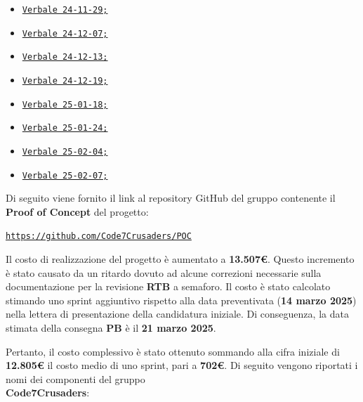 \documentclass{article}
\begin{document}
\begin{itemize}
\begin{itemize}
            \item \href{https://code7crusaders.github.io/docs/RTB/verbali_interni/verbale_24-11-29_v1.0.html}{\texttt{Verbale 24-11-29;}}
            \item \href{https://code7crusaders.github.io/docs/RTB/verbali_interni/verbale_24-12-07_v1.0.html}{\texttt{Verbale 24-12-07;}}
            \item \href{https://code7crusaders.github.io/docs/RTB/verbali_interni/verbale_24-12-13_v1.0.html}{\texttt{Verbale 24-12-13;}}
            \item \href{https://code7crusaders.github.io/docs/RTB/verbali_interni/verbale_24-12-19_v1.0.html}{\texttt{Verbale 24-12-19;}}
            \item \href{https://code7crusaders.github.io/docs/RTB/verbali_interni/verbale_25-01-18_v1.0.html}{\texttt{Verbale 25-01-18;}}
            \item \href{https://code7crusaders.github.io/docs/RTB/verbali_interni/verbale_25-01-24_v1.0.html}{\texttt{Verbale 25-01-24;}}
            \item \href{https://code7crusaders.github.io/docs/RTB/verbali_interni/verbale_25-02-04_v1.0.html}{\texttt{Verbale 25-02-04;}}
            \item \href{https://code7crusaders.github.io/docs/RTB/verbali_interni/verbale_25-02-07_v1.0.html}{\texttt{Verbale 25-02-07;}}
        \end{itemize}
\end{itemize}

Di seguito viene fornito il link al repository GitHub del gruppo contenente il \textbf{Proof of Concept} del progetto:
\begin{center}
    \texttt{\url{https://github.com/Code7Crusaders/POC}}
\end{center}

Il costo di realizzazione del progetto è aumentato a \textbf{13.507\euro}. Questo incremento è stato causato da un ritardo dovuto ad alcune correzioni necessarie sulla documentazione per la revisione \textbf{RTB} a semaforo. Il costo è stato calcolato stimando uno sprint aggiuntivo rispetto alla data preventivata (\textbf{14 marzo 2025}) nella lettera di presentazione della candidatura iniziale. Di conseguenza, la data stimata della consegna \textbf{PB} è il \textbf{21 marzo 2025}.

Pertanto, il costo complessivo è stato ottenuto sommando alla cifra iniziale di \textbf{12.805\euro} il costo medio di uno sprint, pari a \textbf{702\euro}.
Di seguito vengono riportati i nomi dei componenti del gruppo \\
\textbf{Code7Crusaders}:\\
\end{document}
